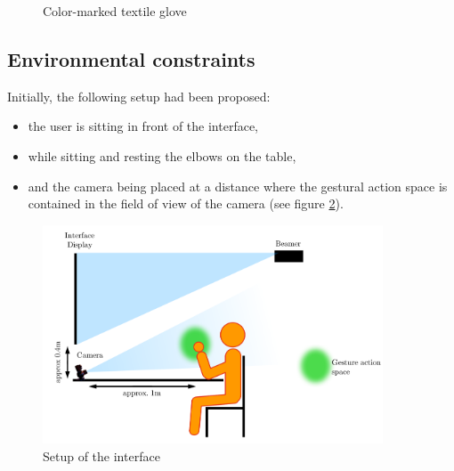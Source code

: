 \begin{figure}[H]
   \centering
      \hspace{0.05\textwidth}
   	\hspace{0.05\textwidth}
   \caption{Color-marked textile glove}
   \label{fig:glove}
\end{figure}

\subsection{Environmental constraints}
\label{sub:environmental-constraints}

Initially, the following setup had been proposed:
\begin{itemize}
	\item the user is sitting in front of the interface,
	\item while sitting and resting the elbows on the table,
	\item and the camera being placed at a distance where the gestural action space is contained in the field of view of the camera (see figure \ref{fig:setup}).
\end{itemize}

\begin{figure}[H]
\center
\includegraphics[width=0.9\textwidth]{images/setup} 
\caption{Setup of the interface}
\label{fig:setup}
\end{figure}

